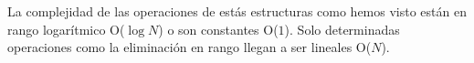 La complejidad de las operaciones de estás estructuras como hemos visto están en rango logarítmico O($\log N$) o son constantes O($1$). Solo determinadas operaciones como la eliminación en rango llegan a ser lineales O($N$).